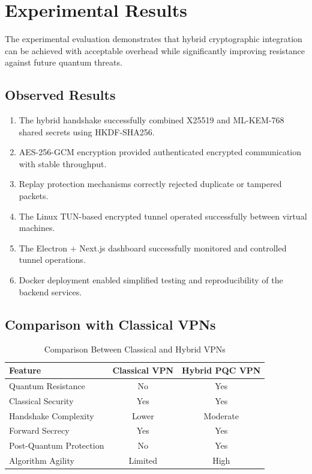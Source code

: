 \section{Experimental Results}
\label{sec:results}

The experimental evaluation demonstrates that hybrid cryptographic integration can be achieved with acceptable overhead while significantly improving resistance against future quantum threats.

\subsection{Observed Results}

\begin{enumerate}
    \item The hybrid handshake successfully combined X25519 and ML-KEM-768 shared secrets using HKDF-SHA256.

    \item AES-256-GCM encryption provided authenticated encrypted communication with stable throughput.

    \item Replay protection mechanisms correctly rejected duplicate or tampered packets.

    \item The Linux TUN-based encrypted tunnel operated successfully between virtual machines.

    \item The Electron + Next.js dashboard successfully monitored and controlled tunnel operations.

    \item Docker deployment enabled simplified testing and reproducibility of the backend services.
\end{enumerate}

\subsection{Comparison with Classical VPNs}

\begin{table}[H]
\centering
\begin{tabular}{|l|c|c|}
\hline
\textbf{Feature} & \textbf{Classical VPN} & \textbf{Hybrid PQC VPN} \\ \hline
Quantum Resistance & No & Yes \\ \hline
Classical Security & Yes & Yes \\ \hline
Handshake Complexity & Lower & Moderate \\ \hline
Forward Secrecy & Yes & Yes \\ \hline
Post-Quantum Protection & No & Yes \\ \hline
Algorithm Agility & Limited & High \\ \hline
\end{tabular}
\caption{Comparison Between Classical and Hybrid VPNs}
\end{table}

